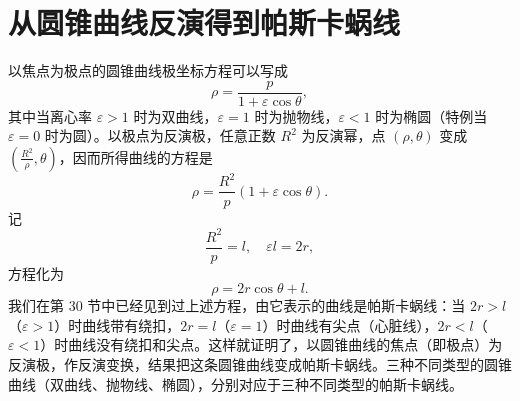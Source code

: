 \section{从圆锥曲线反演得到帕斯卡蜗线}

以焦点为极点的圆锥曲线极坐标方程可以写成
\[
  \rho = \frac{p}{1+\varepsilon\cos\theta},
\]
其中当离心率 $\varepsilon>1$ 时为双曲线，$\varepsilon=1$ 时为抛物线，$\varepsilon<1$ 时为椭圆（特例当 $\varepsilon=0$ 时为圆）。以极点为反演极，任意正数 $R^2$ 为反演幂，点 $(\rho,\theta)$ 变成 $\left(\frac{R^2}{\rho},\theta\right)$，因而所得曲线的方程是
\[
  \rho = \frac{R^2}{p}(1+\varepsilon\cos\theta).
\]
记
\[
  \frac{R^2}{p} = l,\quad \varepsilon l = 2r,
\]
方程化为
\[
  \rho = 2r\cos\theta + l.
\]
我们在第 30 节中已经见到过上述方程，由它表示的曲线是帕斯卡蜗线：当 $2r>l$（$\varepsilon>1$）时曲线带有绕扣，$2r=l$（$\varepsilon=1$）时曲线有尖点（心脏线），$2r<l$（$\varepsilon<1$）时曲线没有绕扣和尖点。这样就证明了，以圆锥曲线的焦点（即极点）为反演极，作反演变换，结果把这条圆锥曲线变成帕斯卡蜗线。三种不同类型的圆锥曲线（双曲线、抛物线、椭圆），分别对应于三种不同类型的帕斯卡蜗线。
